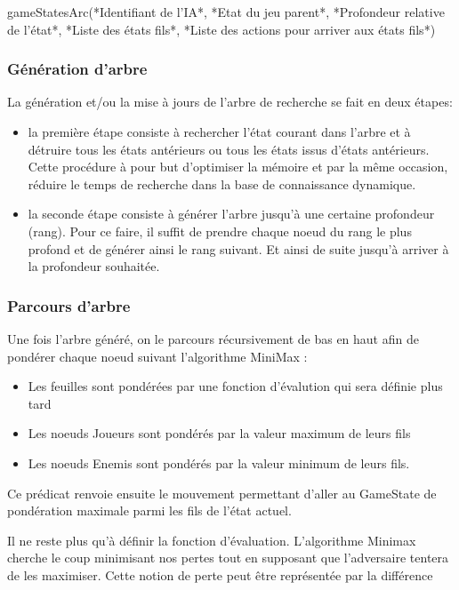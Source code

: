 \documentclass[]{article}
\begin{document}
	gameStatesArc(*Identifiant de l'IA*, *Etat du jeu parent*, *Profondeur relative de l'état*, *Liste des états fils*, *Liste des actions pour arriver aux états fils*)

\subsubsection{Génération d'arbre}

La génération et/ou la mise à jours de l'arbre de recherche se fait en deux étapes:
\begin{itemize}
\item la première étape consiste à rechercher l'état courant dans l'arbre et à détruire tous les états antérieurs ou tous les états issus d'états antérieurs. Cette procédure à pour but d'optimiser la mémoire et par la même occasion, réduire le temps de recherche dans la base de connaissance dynamique.
\item la seconde étape consiste à générer l'arbre jusqu'à une certaine profondeur (rang). Pour ce faire, il suffit de prendre chaque noeud du rang le plus profond et de générer ainsi le rang suivant. Et ainsi de suite jusqu'à arriver à la profondeur souhaitée.
\end{itemize}

\subsubsection{Parcours d'arbre}

Une fois l'arbre généré, on le parcours récursivement de bas en haut afin de pondérer chaque noeud suivant l'algorithme MiniMax :
\begin{itemize}
\item Les feuilles sont pondérées par une fonction d'évalution qui sera définie plus tard
\item Les noeuds Joueurs sont pondérés par la valeur maximum de leurs fils
\item Les noeuds Enemis sont pondérés par la valeur minimum de leurs fils.
\end{itemize}

Ce prédicat renvoie ensuite le mouvement permettant d'aller au GameState de pondération maximale parmi les fils de l'état actuel.

Il ne reste plus qu'à définir la fonction d'évaluation. L'algorithme Minimax cherche le coup minimisant nos pertes tout en supposant que l'adversaire tentera de les maximiser. Cette notion de perte peut être représentée par la différence 
\end{document}

